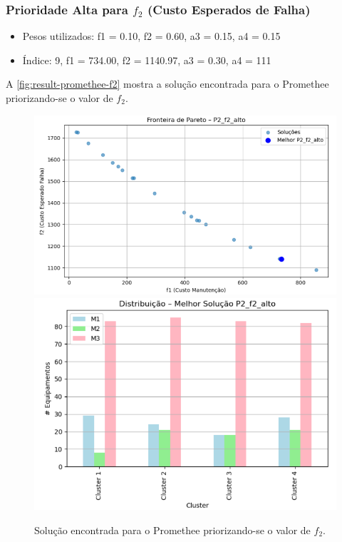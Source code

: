 \documentclass[conference]{IEEEtran}
\begin{document}
\subsubsection{Prioridade Alta para $f_2$ (Custo Esperados de Falha)}

\begin{itemize}
	\item Pesos utilizados: f1 = 0.10, f2 = 0.60, a3 = 0.15, a4 = 0.15
	\item Índice: 9, f1 = 734.00, f2 = 1140.97, a3 = 0.30, a4 = 111
\end{itemize}

A \autoref{fig:result-promethee-f2} mostra a solução encontrada para o Promethee 
priorizando-se o valor de $f_2$.


\begin{figure}[htbp]
    \centering
    \includegraphics[width=\columnwidth,trim=1 1 1 1,clip]{../images/fronteira-promethee-f2.png}
    \includegraphics[width=\columnwidth,trim=1 1 1 1,clip]{../images/result-promethee-f2.png}
    \caption{\label{fig:result-promethee-f2}
	Solução encontrada para o Promethee 
priorizando-se o valor de $f_2$.}
\end{figure}
\end{document}
